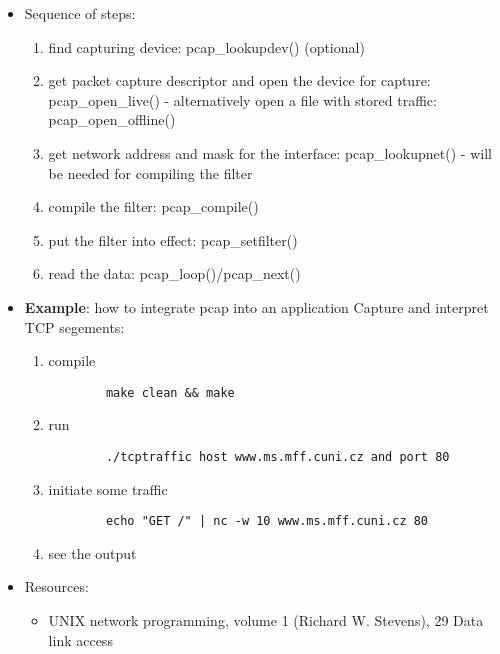 
\begin{itemize}
  \item Sequence of steps:
  \begin{enumerate}
    \item find capturing device: pcap\_lookupdev() (optional)
    \item get packet capture descriptor and open the device for capture:
      pcap\_open\_live()
      - alternatively open a file with stored traffic: pcap\_open\_offline()
    \item get network address and mask for the interface: pcap\_lookupnet()
      - will be needed for compiling the filter
    \item compile the filter: pcap\_compile()
    \item put the filter into effect: pcap\_setfilter()
    \item read the data: pcap\_loop()/pcap\_next()
  \end{enumerate}
  \item {\bf Example}: how to integrate pcap into an application
	 Capture and interpret TCP segements:
  \begin{enumerate}
	 \item compile
\begin{verbatim}
	    make clean && make
\end{verbatim}
	 \item run
\begin{verbatim}
	    ./tcptraffic host www.ms.mff.cuni.cz and port 80
\end{verbatim}
	 \item initiate some traffic
\begin{verbatim}
	    echo "GET /" | nc -w 10 www.ms.mff.cuni.cz 80
\end{verbatim}
	 \item see the output
  \end{enumerate}
  \item Resources:
    \begin{itemize}
      \item UNIX network programming, volume 1 (Richard W. Stevens),
         29 Data link access
    \end{itemize}
\end{itemize}



